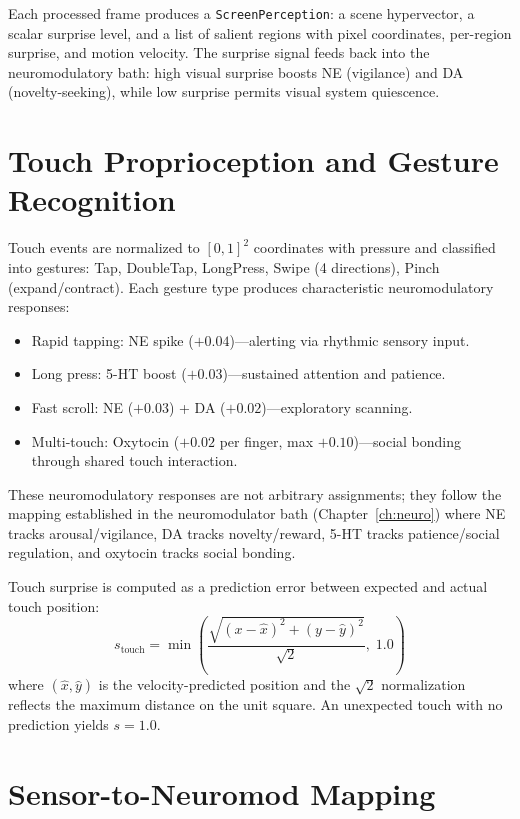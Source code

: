 \documentclass[12pt]{book}
\begin{document}
Each processed frame produces a \texttt{ScreenPerception}: a scene hypervector, a scalar surprise level, and a list of salient regions with pixel coordinates, per-region surprise, and motion velocity. The surprise signal feeds back into the neuromodulatory bath: high visual surprise boosts NE (vigilance) and DA (novelty-seeking), while low surprise permits visual system quiescence.

\section{Touch Proprioception and Gesture Recognition}

Touch events are normalized to $[0, 1]^2$ coordinates with pressure and classified into gestures: Tap, DoubleTap, LongPress, Swipe (4 directions), Pinch (expand/contract). Each gesture type produces characteristic neuromodulatory responses:

\begin{itemize}
  \item Rapid tapping: NE spike ($+0.04$)---alerting via rhythmic sensory input.
  \item Long press: 5-HT boost ($+0.03$)---sustained attention and patience.
  \item Fast scroll: NE ($+0.03$) + DA ($+0.02$)---exploratory scanning.
  \item Multi-touch: Oxytocin ($+0.02$ per finger, max $+0.10$)---social bonding through shared touch interaction.
\end{itemize}

These neuromodulatory responses are not arbitrary assignments; they follow the mapping established in the neuromodulator bath (Chapter~\ref{ch:neuro}) where NE tracks arousal/vigilance, DA tracks novelty/reward, 5-HT tracks patience/social regulation, and oxytocin tracks social bonding.

Touch surprise is computed as a prediction error between expected and actual touch position:
\begin{equation}
s_{\text{touch}} = \min\left(\frac{\sqrt{(x - \hat{x})^2 + (y - \hat{y})^2}}{\sqrt{2}}, \; 1.0\right)
\end{equation}
where $(\hat{x}, \hat{y})$ is the velocity-predicted position and the $\sqrt{2}$ normalization reflects the maximum distance on the unit square. An unexpected touch with no prediction yields $s = 1.0$.

\section{Sensor-to-Neuromod Mapping}
\end{document}
